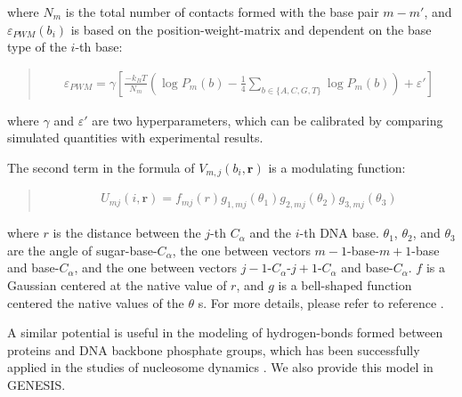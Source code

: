\documentclass[a4paper,11pt,oneside,english]{sphinxmanual}
\begin{document}
where \(N_m\) is the total number of contacts formed with the base pair
\(m-m'\), and \(\varepsilon_{PWM} (b_i)\) is based on the
position-weight-matrix and dependent on the base type of the \(i\)-th base:
\begin{quote}

\vspace{-5mm}
\begin{equation*}
\begin{split}\varepsilon_{PWM} = \gamma \left[  \frac{-k_B T}{N_m} \left( \log P_m(b) - \frac{1}{4} \sum_{b\in \{A, C, G, T\}} \log P_m(b) \right) + \varepsilon'  \right]\end{split}
\end{equation*}
\vspace{-3mm}
\end{quote}

where \(\gamma\) and \(\varepsilon'\) are two hyperparameters, which can
be calibrated by comparing simulated quantities with experimental results.

The second term in the formula of \(V_{m, j} (b_i, \mathbf{r})\) is a
modulating function:
\begin{quote}

\vspace{-5mm}
\begin{equation*}
\begin{split}U_{mj}(i, \mathbf{r}) = f_{mj}(r)g_{1,mj} (\theta_1) g_{2, mj} (\theta_2) g_{3,mj} (\theta_{3})\end{split}
\end{equation*}
\vspace{-3mm}
\end{quote}

where \(r\) is the distance between the \(j\)-th \(C_\alpha\) and
the \(i\)-th DNA base.  \(\theta_1\), \(\theta_2\), and
\(\theta_3\) are the angle of sugar-base-\(C_\alpha\), the one between
vectors \(m-1\)-base-\(m+1\)-base and base-\(C_\alpha\), and the one
between vectors \(j-1\)-\(C_\alpha\)-\(j+1\)-\(C_\alpha\) and
base-\(C_\alpha\).  \(f\) is a Gaussian centered at the native value of
\(r\), and \(g\) is a bell-shaped function centered the native values of
the \(\theta\) s.  For more details, please refer to reference
.

A similar potential is useful in the modeling of hydrogen-bonds formed between
proteins and DNA backbone phosphate groups, which has been successfully applied
in the studies of nucleosome dynamics . We
also provide this model in GENESIS.
\end{document}
